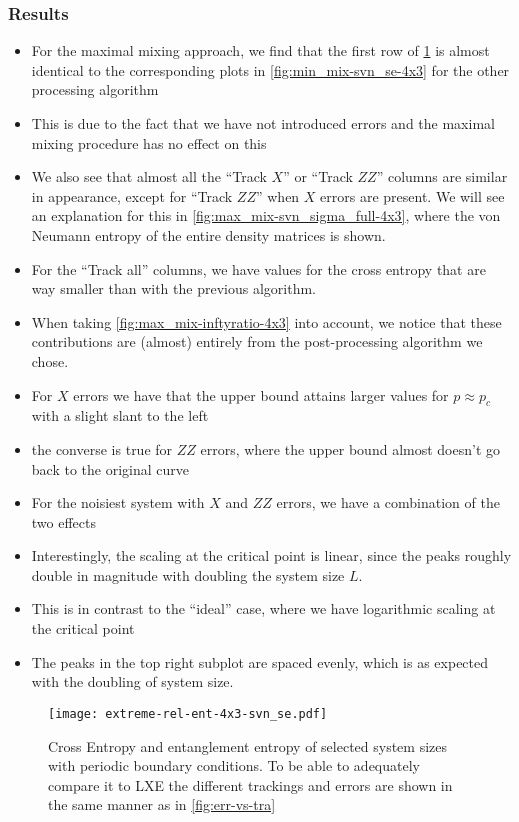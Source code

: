 \subsubsection{Results}
\begin{itemize}
  \item For the maximal mixing approach, we find that the first row of
    \cref{fig:max_mix-svn_se-4x3} is almost identical to the corresponding
    plots in \cref{fig:min_mix-svn_se-4x3} for the other processing
    algorithm
  \item This is due to the fact that we have not introduced errors and the
    maximal mixing procedure has no effect on this
  \item We also see that almost all the \enquote{Track $X$} or \enquote{Track
    $ZZ$} columns are similar in appearance, except for \enquote{Track $ZZ$}
    when $X$ errors are present. We will see an explanation for this in
    \cref{fig:max_mix-svn_sigma_full-4x3}, where the von Neumann entropy of the
    entire density matrices is shown.
  \item For the \enquote{Track all} columns, we have values for the cross
    entropy that are way smaller than with the previous algorithm. 
  \item When taking \cref{fig:max_mix-inftyratio-4x3} into account, we notice
    that these contributions are (almost) entirely from the post-processing
    algorithm we chose.
  \item For $X$ errors we have that the upper bound attains larger values for
    $p \approx p_c$ with a slight slant to the left
  \item the converse is true for $ZZ$ errors, where the upper bound almost
    doesn't go back to the original curve
  \item For the noisiest system with $X$ and $ZZ$ errors, we have a combination
    of the two effects
  \item Interestingly, the scaling at the critical point is linear, since the
    peaks roughly double in magnitude with doubling the system size $L$.
  \item This is in contrast to the \enquote{ideal} case, where we have
    logarithmic scaling at the critical point
  \item The peaks in the top right subplot are spaced evenly, which is as
    expected with the doubling of system size.
\end{itemize}
\begin{figure}[p]
  \centering
  \texttt{[image: extreme-rel-ent-4x3-svn\_se.pdf]}
  \caption{Cross Entropy and entanglement entropy of selected system sizes with
  periodic boundary conditions. To be able to adequately compare it to LXE the
different trackings and errors are shown in the same manner as in
\cref{fig:err-vs-tra}}
  \label{fig:max_mix-svn_se-4x3}
\end{figure}
